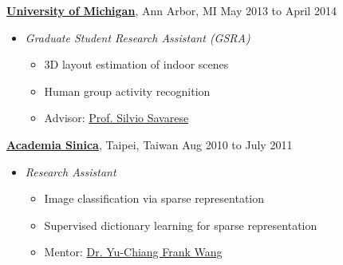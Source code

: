 \documentclass[10pt]{article}
\newenvironment{innerlist}[1][\enskip\textbullet]%
        {\begin{itemize}[#1,leftmargin=*,parsep=0pt,itemsep=0pt,topsep=0pt,partopsep=0pt]}
        {\end{itemize}}
\begin{document}
\vspace{.1in}
\href{http://www.umich.edu}{\textbf{University of Michigan}}, Ann Arbor, MI \hfill {May 2013 to April 2014} \\
\vspace{-.15in}
\begin{innerlist}
\item[] \emph{Graduate Student Research Assistant (GSRA)} \\
    \vspace{-.15in}
    \begin{innerlist}
    \item 3D layout estimation of indoor scenes
    \item Human group activity recognition
    \item Advisor: \href{http://cvgl.stanford.edu/silvio/}{Prof. Silvio Savarese}
    \end{innerlist}
\end{innerlist}
\vspace{.1in}
\href{http://www.sinica.edu.tw}{\textbf{Academia Sinica}}, Taipei, Taiwan \hfill {Aug 2010 to July 2011} \\
\vspace{-.15in}
\begin{innerlist}
\item[] \emph{Research Assistant} \\
    \vspace{-.15in}
    \begin{innerlist}
    \item Image classification via sparse representation
    \item Supervised dictionary learning for sparse representation
    \item Mentor: \href{http://www.citi.sinica.edu.tw/pages/ycwang/}{Dr. Yu-Chiang Frank Wang}
    \end{innerlist}
\end{innerlist}
\end{document}
